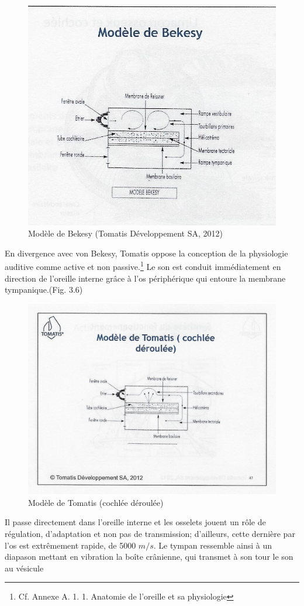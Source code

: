 \begin{figure}[h]
	\centering
	\includegraphics[width=0.5\linewidth]{images/Cochleederoule_bas.jpg}
	\caption[Modèle de Békésy]{Modèle de Bekesy (Tomatis Développement SA, 2012)}
	\label{fig:cochleederoulebas}
\end{figure}
En divergence avec von Bekesy, Tomatis oppose la conception de la
physiologie auditive comme active et non
passive.\footnote{Cf. Annexe A. 1. 1. Anatomie de l'oreille et sa physiologie}
Le son est conduit immédiatement en direction de l'oreille 
interne grâce à l'os périphérique qui entoure la membrane tympanique.(Fig. 3.6) 
\begin{figure}
	\centering
	\includegraphics[width=0.5\linewidth]{images/Cochleederoule_haut.jpg}
	\caption[Cochlée selon Tomatis]{Modèle de Tomatis (cochlée déroulée)}
	
	\label{fig:cochleederoulehaut}
\end{figure}
Il passe directement  
dans l'oreille interne et  les osselets jouent un rôle de régulation, 
d'adaptation et non pas de transmission; d'ailleurs, cette dernière 
par l'os 
est extrêmement rapide, de
5000 $m/s$. Le tympan ressemble ainsi à un 
diapason mettant en vibration la boîte crânienne, qui transmet à son tour  le son au vésicule 
